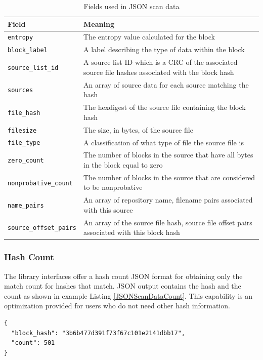 \documentclass[11pt,fleqn]{article} %
\begin{document}
\begin{table}[!ht]

\centering
\caption{Fields used in JSON scan data}
\label{tab:JSONScanDataExpanded}
\begin{tabular}{|p{5 cm}|p{8.8 cm}|}
\hline \hline
\textbf{Field} & \textbf{Meaning} \\
\hline
\verb+entropy+ & The entropy value calculated for the block\\
\hline
\verb+block_label+ & A label describing the type of data within the block\\
\hline
\verb+source_list_id+ & A source list ID which is a CRC of the associated source file hashes associated with the block hash\\
\hline
\verb+sources+ & An array of source data for each source matching the hash\\
\hline
\verb+file_hash+ & The hexdigest of the source file containing the block hash\\
\hline
\verb+filesize+ & The size, in bytes, of the source file\\
\hline
\verb+file_type+ & A classification of what type of file the source file is\\
\hline
\verb+zero_count+ & The number of blocks in the source that have all bytes in the block equal to zero\\
\hline
\verb+nonprobative_count+ & The number of blocks in the source that are considered to be nonprobative\\
\hline
\verb+name_pairs+ & An array of repository name, filename pairs associated with this source\\
\hline
\verb+source_offset_pairs+ & An array of the source file hash, source file offset pairs associated with this block hash\\
\hline
\end{tabular}
\end{table}

\subsubsection{Hash Count}
The \hdb library interfaces offer a hash count JSON format for obtaining only the match count for hashes that match.  JSON output contains the hash and the count as shown in example Listing \ref{JSONScanDataCount}. This capability is an optimization provided for users who do not need other hash information.

\lstset{style=customfile}
\begin{lstlisting}[float, caption={Example JSON block hash data count output from a scan match, with line breaks added for readability}, label=JSONScanDataCount]
{
  "block_hash": "3b6b477d391f73f67c101e2141dbb17",
  "count": 501
}
\end{lstlisting}
\end{document}
